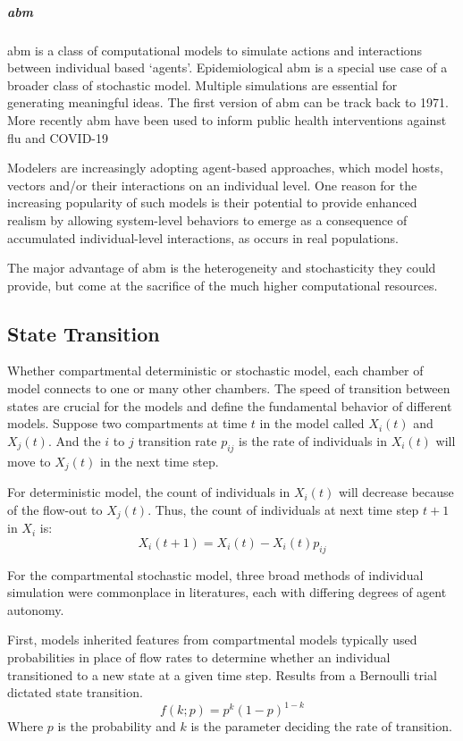 \documentclass[a4paper, 12pt, twoside]{article}
\begin{document}
\subparagraph{\gls{abm}}
\gls{abm} is a class of computational models to simulate actions and interactions between individual based `agents'.
Epidemiological \gls{abm} is a special use case of a broader class of stochastic model.
Multiple simulations are essential for generating meaningful ideas.
The first version of \gls{abm} can be track back to 1971\cite{Schelling1971}.
More recently \gls{abm} have been used to inform public health interventions against flu\cite{Ferguson2006a, Ferguson2005} and COVID-19\cite{Maziarz2020, Ferguson2020, Chang2020}

Modelers are increasingly adopting agent-based approaches, which model hosts, vectors and/or their interactions on an individual level.
One reason for the increasing popularity of such models is their potential to provide enhanced realism by allowing system-level behaviors to emerge as a consequence of accumulated individual-level interactions, as occurs in real populations.

The major advantage of \gls{abm} is the heterogeneity and stochasticity they could provide, but come at the sacrifice of the much higher computational resources.

\subsection{State Transition}
Whether compartmental deterministic or stochastic model, each chamber of model connects to one or many other chambers.
The speed of transition between states are crucial for the models and define the fundamental behavior of different models.
Suppose two compartments at time $t$ in the model called $X_i(t)$ and $X_j(t)$. And the  $i$ to  $j$ transition rate  $p_{ij}$ is the rate of individuals in $X_i(t)$ will move to $X_j(t)$ in the next time step.

For deterministic model, the count of individuals in $X_i(t)$ will decrease because of the flow-out to $X_j(t)$.
Thus, the count of individuals at next time step $t+1$ in $X_i$ is:
\begin{equation}
	X_i(t+1) = X_i(t) - X_i(t)p_{ij}
\end{equation}

For the compartmental stochastic model, three broad methods of individual simulation were commonplace in literatures, each with differing degrees of agent autonomy.

First, models inherited features from compartmental models typically used probabilities in place of flow rates to determine whether an individual transitioned to a new state at a given time step.
Results from a Bernoulli trial dictated state transition.
\begin{equation}
	f(k;p) = p^k ( 1 - p )^{1 - k}
\end{equation}
Where $p$ is the probability and  $k$ is the parameter deciding the rate of transition.
\end{document}

